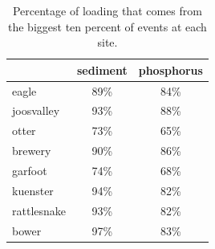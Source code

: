 \documentclass[10pt]{article}
\begin{document}
\begin{table}[ht]
\begin{center}
\begin{tabular}{lcc}
  & sediment & phosphorus \\ 
  \hline
eagle & 89\% & 84\% \\ 
  joosvalley & 93\% & 88\% \\ 
  otter & 73\% & 65\% \\ 
  brewery & 90\% & 86\% \\ 
  garfoot & 74\% & 68\% \\ 
  kuenster & 94\% & 82\% \\ 
  rattlesnake & 93\% & 82\% \\ 
  bower & 97\% & 83\% \\ 
  \end{tabular}
\caption{Percentage of loading that comes from the biggest ten percent of events at each site.}
\label{tab:stot}
\end{center}
\end{table}
\end{document}
